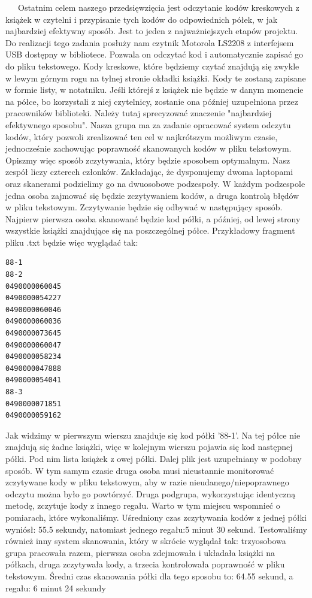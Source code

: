 ~~~Ostatnim celem naszego przedsięwzięcia jest odczytanie kodów kreskowych z książek w czytelni i przypisanie tych kodów do odpowiednich półek, w jak najbardziej efektywny sposób. Jest to jeden z najważniejszych etapów projektu. Do realizacji tego zadania posłuży nam czytnik Motorola LS2208 z interfejsem USB dostępny w bibliotece. Pozwala on odczytać kod i automatycznie zapisać go do pliku tekstowego. Kody kreskowe, które będziemy czytać znajdują się zwykle w lewym górnym rogu na tylnej stronie okładki książki. Kody te zostaną zapisane w formie listy, w notatniku. Jeśli którejś z książek nie będzie w danym momencie na półce, bo korzystali z niej czytelnicy, zostanie ona później uzupełniona przez pracowników biblioteki.
Należy tutaj sprecyzować znaczenie "najbardziej efektywnego sposobu". Nasza grupa ma za zadanie opracować system odczytu kodów, który pozwoli zrealizować ten cel w najkrótszym możliwym czasie, jednocześnie zachowując poprawność skanowanych kodów w pliku tekstowym. Opiszmy więc sposób zczytywania, który będzie sposobem optymalnym. Nasz zespół liczy czterech członków. Zakładając, że dysponujemy dwoma laptopami oraz skanerami podzielimy go na dwuosobowe podzespoły. W każdym podzespole jedna osoba zajmować się będzie zczytywaniem kodów, a druga kontrolą błędów w pliku tekstowym. Zczytywanie będzie się odbywać w następujący sposób. Najpierw pierwsza osoba skanowanć będzie kod półki, a później, od lewej strony wszystkie książki znajdujące się na poszczególnej półce. Przykładowy fragment pliku .txt będzie więc wyglądać tak: 
\begin{lstlisting}
88-1
88-2
0490000060045
0490000054227
0490000060046
0490000060036
0490000073645
0490000060047
0490000058234
0490000047888
0490000054041
88-3
0490000071851
0490000059162
\end{lstlisting}
Jak widzimy w pierwszym wierszu znajduje się kod półki '88-1'. Na tej półce nie znajdują się żadne książki, więc w kolejnym wierszu pojawia się kod następnej półki. Pod nim lista książek z owej półki. Dalej plik jest uzupełniany w podobny sposób. W tym samym czasie  druga osoba musi nieustannie monitorować zczytywane kody w pliku tekstowym, aby w razie nieudanego/niepoprawnego odczytu można było go powtórzyć. Druga podgrupa, wykorzystując identyczną metodę, zczytuje kody z innego regału. Warto w tym miejscu wspomnieć o pomiarach, które wykonaliśmy. Uśredniony czas zczytywania kodów z jednej półki wyniósł: 55.5 sekundy, natomiast jednego regału:5 minut 30 sekund.
Testowaliśmy również inny system skanowania, który w skrócie wyglądał tak: trzyosobowa grupa pracowała razem, pierwsza osoba zdejmowała i układała książki na półkach, druga zczytywała kody, a trzecia kontrolowała poprawność w pliku tekstowym. Średni czas skanowania półki dla tego sposobu to: 64.55 sekund, a regału: 6 minut 24 sekundy
